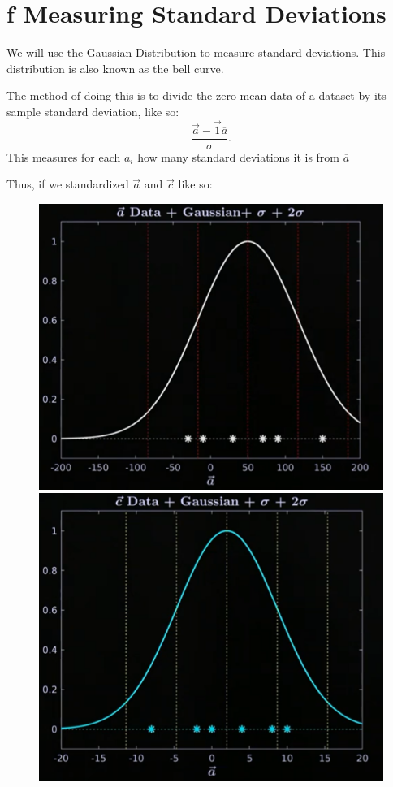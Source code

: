 \documentclass[12pt]{book}
\begin{document}
\section*{f Measuring Standard Deviations}
We will use the Gaussian Distribution to measure standard deviations. 
This distribution is also known as the bell curve.

The method of doing this is to divide the zero mean data of a dataset by its sample standard deviation, like so:
\[
\frac{\vec a - \vec 1\overline{a}}{\sigma}
.\] 
This measures for each $a_i$ how many standard deviations it is from  $\overline{a}$
 
Thus, if we standardized $\vec a$ and  $\vec c$ like so:
 \begin{figure}[h]
        \centering
        \includegraphics[scale=0.40]{./figures/vecAstd}
        \includegraphics[scale=0.40]{./figures/vecCstd}
\end{figure}
\pagebreak
\end{document}
